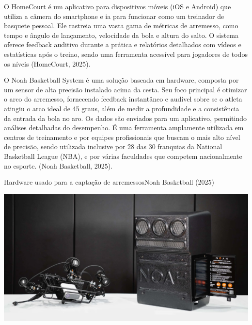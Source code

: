 O HomeCourt é um aplicativo para dispositivos móveis (iOS e Android) que utiliza a câmera do smartphone e \ac{ia} para funcionar como um treinador de basquete pessoal. 
Ele rastreia uma vasta gama de métricas de arremesso, como tempo e ângulo de lançamento, velocidade da bola e altura do salto. O sistema oferece feedback auditivo durante a prática e relatórios detalhados com vídeos e estatísticas após o treino, 
sendo uma ferramenta acessível para jogadores de todos os níveis (HomeCourt, 2025).

O Noah Basketball System é uma solução baseada em hardware, composta por um sensor de alta precisão instalado acima da cesta. Seu foco principal é otimizar o arco do arremesso, 
fornecendo feedback instantâneo e audível sobre se o atleta atingiu o arco ideal de 45 graus, além de medir a profundidade e a consistência da entrada da bola no aro. Os dados são enviados para um aplicativo, 
permitindo análises detalhadas do desempenho. É uma ferramenta amplamente utilizada em centros de treinamento e por equipes profissionais que buscam o mais alto nível de precisão, 
sendo utilizada inclusive por 28 das 30 franquias da National Basketball League (NBA), e por várias faculdades que competem nacionalmente no esporte. (Noah Basketball, 2025).

\begin{figura}{Hardware usado para a captação de arremessos}{Noah Basketball (2025)}
    \begin{flushleft}
        \label{fig:noah}
        \includegraphics[width=0.75\linewidth]{resources/floats/ilustracoes/noah.png}
    \end{flushleft}
\end{figura}
\FloatBarrier


